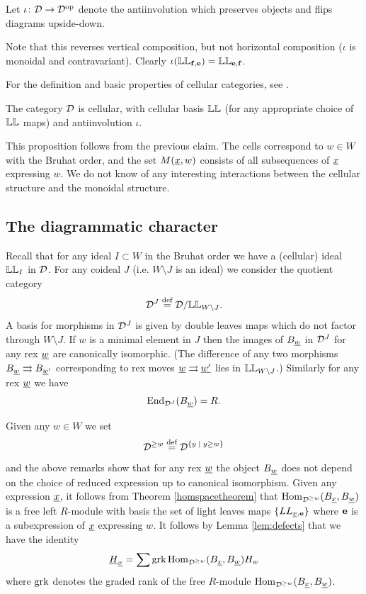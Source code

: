 \begin{defn} Let $\iota \colon {\mathcal{D}} \rightarrow {\mathcal{D}}^{{\mathrm{op}}}$ denote the antiinvolution which preserves objects and flips diagrams upside-down. \end{defn}

Note that this reverses vertical composition, but not horizontal composition ($\iota$ is monoidal and contravariant). Clearly $\iota(\mathbb{LL}_{{\mathbf f},{\mathbf e}}) = \mathbb{LL}_{{\mathbf e},{\mathbf f}}$.

For the definition and basic properties of cellular categories, see \cite{West}.

\begin{prop} The category ${\mathcal{D}}$ is cellular, with cellular basis $\mathbb{LL}$ (for any appropriate choice of $\mathbb{LL}$ maps) and antiinvolution $\iota$. \label{Discellular} \end{prop}

This proposition follows from the previous claim. The cells correspond to $w \in W$ with the Bruhat order, and the set $M({\underline{x}},w)$ consists of all subsequences of ${\underline{x}}$ expressing $w$. We do not know of any interesting interactions between the cellular structure and the monoidal structure.


\subsection{The diagrammatic character}


 Recall that for any ideal $I \subset W$ in the Bruhat order we have a (cellular) ideal $\mathbb{LL}_I$ in ${\mathcal{D}}$. For any coideal $J$ (i.e. $W \setminus J$ is an ideal) we consider the quotient category
\[
{\mathcal{D}}^J \stackrel{\mbox{\scriptsize{def}}}{=} {\mathcal{D}}/\mathbb{LL}_{W \setminus J}.
\]
A basis for morphisms in ${\mathcal{D}}^J$ is given by double leaves maps which do not factor through $W \setminus J$. If $w$ is a minimal element in $J$ then the images of $B_{\underline{w}}$ in ${\mathcal{D}}^J$ for any rex $\underline{w}$ are canonically isomorphic. (The difference of any two morphisms $B_{\underline{w}} \rightrightarrows B_{\underline{w}'}$ corresponding to rex moves $\underline{w} \rightrightarrows \underline{w'}$ lies in $\mathbb{LL}_{W \setminus J}$.) Similarly for any rex $\underline{w}$ we have
\begin{equation} \label{endquot}
\operatorname{End}_{{\mathcal{D}}^J}(B_{\underline{w}}) = R.
\end{equation}

Given any $w \in W$ we set
\[
{\mathcal{D}}^{\ge w} \stackrel{\mbox{\scriptsize{def}}}{=} {\mathcal{D}}^{ \{ y \;|\; y \ge w \} }
\]
and the above remarks show that for any rex $\underline{w}$ the object $B_{\underline{w}}$ does not depend on the choice of reduced expression up to canonical isomorphism. Given any expression $\underline{x}$, it follows from Theorem \ref{homspacetheorem} that $\operatorname{Hom}_{{\mathcal{D}}^{\ge w}}(B_{\underline{x}}, B_{\underline{w}})$ is a free left $R$-module with basis the set of light leaves maps $\{ LL_{\underline{x}, {\mathbf e}} \}$ where ${\mathbf e}$ is a subexpression of $\underline{x}$ expressing $w$. It follows by Lemma \ref{lem:defects} that we have the identity
\begin{equation} \label{bsch}
\underline{H}_{\underline{x}} = \sum  \operatorname{grk} \operatorname{Hom}_{{\mathcal{D}}^{\ge w}}(B_{\underline{x}}, B_{\underline{w}}) H_w
\end{equation}
where $\operatorname{grk}$ denotes the graded rank of the free $R$-module $\operatorname{Hom}_{{\mathcal{D}}^{\ge w}}(B_{\underline{x}}, B_{\underline{w}})$.

